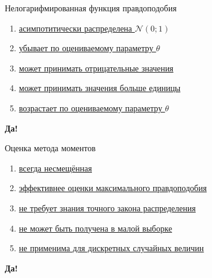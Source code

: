 \documentclass[t]{beamer}
\newcommand{\cN}{\mathcal{N}}
\begin{document}
 \begin{frame} \label{15-Yes} 
\begin{block}{15} 

  Нелогарифмированная функция правдоподобия
  

 \end{block} 
\begin{enumerate} 
\item[] \hyperlink{15-No}{\beamergotobutton{} асимпотитически распределена $\cN(0;1)$}
\item[] \hyperlink{15-No}{\beamergotobutton{} убывает по оцениваемому параметру $\theta$}
\item[] \hyperlink{15-No}{\beamergotobutton{} может принимать отрицательные значения}
\item[] \hyperlink{15-Yes}{\beamergotobutton{} может принимать значения больше единицы}
\item[] \hyperlink{15-No}{\beamergotobutton{} возрастает по оцениваемому параметру $\theta$}
\end{enumerate} 

 \textbf{Да!} 
 \hyperlink{16}{}\end{frame} 


 \begin{frame} \label{16-Yes} 
\begin{block}{16} 

  Оценка метода моментов


 \end{block} 
\begin{enumerate} 
\item[] \hyperlink{16-No}{\beamergotobutton{} всегда несмещённая}
\item[] \hyperlink{16-No}{\beamergotobutton{} эффективнее оценки максимального правдоподобия}
\item[] \hyperlink{16-Yes}{\beamergotobutton{} не требует знания точного закона распределения}
\item[] \hyperlink{16-No}{\beamergotobutton{} не может быть получена в малой выборке}
\item[] \hyperlink{16-No}{\beamergotobutton{} не применима для дискретных случайных величин}
\end{enumerate} 

 \textbf{Да!} 
 \hyperlink{17}{}\end{frame} 
\end{document}
